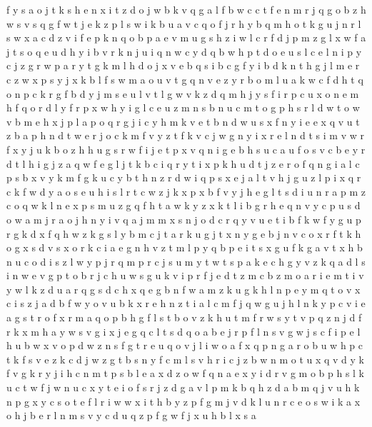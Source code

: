 \documentclass{article}
\begin{document}
f y s a o j t k
s h e n x i t z d o j w b k v q g a l f
b w c
c t f e n m r j q g o b z h w s v
s q g f w t j e k z p l
s w i k b u a v c q o f j r h
y b q m h o t k g u j n r l s w x a c d z v i f e p
k n q o b p a e v m u g s h z i w l c r f d j
p m z g l x w f a j t s o q e u d h y i b v r k n
j u i q
n
w c y d
q b w h p t d o e u s l c
e l n i p y c j z g r
w p a r y t g k m l h d o j x v e b q s i
b c g f y i
b d k n t h g j l m e r c z w x p s
y j x k b l f s w m a o u v t g q n
v e z y r b o m l u a k w c f d h t q
o n p c k r g f b d y j m s e u l v
t l g w v k z d q m h j y s f i r p c u x o n
e m h f q o r d l y
f r p x w h y i g l c e u z m n s
b n u c m t o g p h s r l d w
t o w v b m e h x j p
l a p o q r g j i c y h m k v e t b n d w u s x f
n y i e
e x q v u t
z b a p h n d t w e r j o c k m f v y
z t f k v c j w g n y i x r e l
n
d t s i m v w r f x y j u k b o z h
h u g s r w f i j e t p x
v q n i g e b h s u c a
u f o s v c b e y r d t l h i g j z a q
w f e g l j t k b c i q
r y t i x p k
h u d t j z e r o f q n g i a l c p s b x v y k m
f g k u c y b t h n z r d w i q p s x e j a l
t v h j g u z l p i x q r c k f w d y a o s e
u h i s l r t c w z j k x p
x b f v y j h e g l t s d i u n r a p m z c o q w k
l n e x p s m u z g q f h t a w k y
z x k t l i b g r h e q n v y c p u s d o w a m j
r a o j h
n y i v q a j m
m x s n j o d c r q y v u e t i b f k w
f y g u
p r g k d x f q h w
z k g s l y b m c j t
a r k u g j t x n y
g e b j n v c o x r f t k
h o g x s d v
s x o r k c i a e g n h v z t m l p y q
b p e i t s x g u
f k g a v t x h b n u c o d i s z l w y p j r q m
p r c j s u m y t w
t s p a k e c h g y v
z k q a d l s i n w e v g p t o b r j c h u
w s g u k v i p r f j e d t z m c b
z m o a r i
e m t i v y w l k z d u a r q g
s d c h x q e g b n f w a m z k
u g k h l n p e y m q t o v x c i s z j a d b f w
y o v u b k x r e h n z t i a l c m f j q w g
u j h l n k y p c v i e a g s t r o f x
r m a q o p b h g f l s t
b o v z k h u t m f r w
s y t v
p q z n j d f r k x m h a y w s v g i
x j e g q c l t s
d q o a b e j r p f l n s v g w
j s c f i p e l h u b w x v o
p d w z n s f g t r e u q o v j l i
w o a f x q p
n g a r o b u w h p c t k f s v e z
k c d j w z g t b s n
y f c m l s v
h r i c j z b w n m o t u x q v d y k f
v g k r y j i h c n m t p s b l e a x d z o w f
q n a e x y i d r v g m o b p h s l k u c t w f j
w n u c x y t e i o f s r j z d g a v l p m k b q h
z d a b m q j v u h k n p g x y c s o t e f l r i w
w x i t h b y z p f g m j v d k l u n r c e o s
w i k a x o h j b e r l n m s v y c d u q z p f g
w f j x
u h b l x s a
\end{document}
